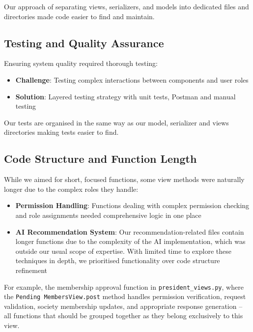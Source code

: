 Our approach of separating views, serializers, and models into dedicated files and directories made code easier to find and maintain.

\subsection{Testing and Quality Assurance}

Ensuring system quality required thorough testing:

\begin{itemize}
    \item \textbf{Challenge}: Testing complex interactions between components and user roles
    \item \textbf{Solution}: Layered testing strategy with unit tests, Postman and manual testing
\end{itemize}

Our tests are organised in the same way as our model, serializer and views directories making tests easier to find.

\subsection{Code Structure and Function Length}
While we aimed for short, focused functions, some view methods were naturally longer due to the complex roles they handle:

\begin{itemize}

    \item \textbf{Permission Handling}: Functions dealing with complex permission checking and role assignments needed comprehensive logic in one place
    
    \item \textbf{AI Recommendation System}: Our recommendation-related files contain longer functions due to the complexity of the AI implementation, which was outside our usual scope of expertise. With limited time to explore these techniques in depth, we prioritised functionality over code structure refinement
\end{itemize}

For example, the membership approval function in \texttt{president\_views.py}, where the \texttt{Pending
MembersView.post} method handles permission verification, request validation, society membership updates, and appropriate response generation – all functions that should be grouped together as they belong exclusively to this view.

